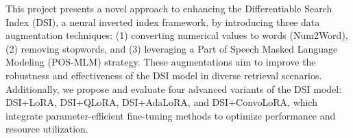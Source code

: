 

This project presents a novel approach to enhancing the Differentiable Search Index (DSI), a neural inverted index framework, by introducing three data augmentation techniques: (1) converting numerical values to words (Num2Word), (2) removing stopwords, and (3) leveraging a Part of Speech Masked Language Modeling (POS-MLM) strategy. These augmentations aim to improve the robustness and effectiveness of the DSI model in diverse retrieval scenarios. Additionally, we propose and evaluate four advanced variants of the DSI model: DSI+LoRA, DSI+QLoRA, DSI+AdaLoRA, and DSI+ConvoLoRA, which integrate parameter-efficient fine-tuning methods to optimize performance and resource utilization.

